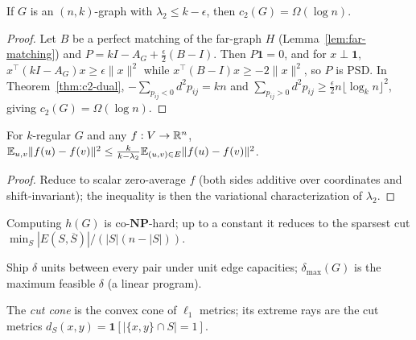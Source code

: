 \begin{theorem}
  \label{thm:expander-distortion}
  If $G$ is an $(n,k)$-graph with $\lambda_2\le k-\epsilon$, then
  $c_2(G)=\Omega(\log n)$.
\end{theorem}
\begin{proof}
  Let $B$ be a perfect matching of the far-graph $H$
  (Lemma~\ref{lem:far-matching}) and $P=kI-A_G+\tfrac\epsilon2(B-I)$. Then
  $P\mathbf 1=0$, and for $x\perp\mathbf 1$, $x^\top(kI-A_G)x\ge\epsilon\|x\|^2$
  while $x^\top(B-I)x\ge-2\|x\|^2$, so $P$ is PSD. In
  Theorem~\ref{thm:c2-dual}, $-\sum_{p_{ij}<0}d^2p_{ij}=kn$ and
  $\sum_{p_{ij}>0}d^2p_{ij}\ge\tfrac\epsilon2n\lfloor\log_kn\rfloor^2$, giving
  $c_2(G)=\Omega(\log n)$.
\end{proof}

\begin{theorem}
  \label{thm:poincare-graph}
  For $k$-regular $G$ and any $f:V\to\mathbb{R}^n$,
  $\mathbb{E}_{u,v}\|f(u)-f(v)\|^2\le\tfrac k{k-\lambda_2}\mathbb{E}_{(u,v)\in E}\|f(u)-f(v)\|^2$.
\end{theorem}
\begin{proof}
  Reduce to scalar zero-average $f$ (both sides additive over coordinates and
  shift-invariant); the inequality is then the variational characterization of
  $\lambda_2$.
\end{proof}

\begin{problem}
  \label{prob:expansion-computation}
  Computing $h(G)$ is co-$\mathbf{NP}$-hard; up to a constant it reduces to the
  sparsest cut $\min_S|E(S,\overline S)|/(|S|(n-|S|))$.
\end{problem}

\begin{definition}
  \label{def:multicommodity-flow}
  Ship $\delta$ units between every pair under unit edge capacities; $\delta_{\max}
  (G)$ is the maximum feasible $\delta$ (a linear program).
\end{definition}

\begin{definition}
  \label{def:cut-cone}
  The \emph{cut cone} is the convex cone of $\ell_1$ metrics; its extreme rays
  are the cut metrics $d_S(x,y)=\mathbf 1[|\{x,y\}\cap S|=1]$.
\end{definition}

